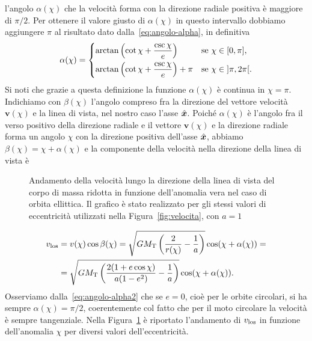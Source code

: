 {l'angolo $\alpha(\chi)$ che la velocità forma con la direzione radiale positiva
è maggiore di $\pi/2$. Per ottenere il valore giusto di $\alpha(\chi)$ in questo
intervallo dobbiamo aggiungere $\pi$ al risultato dato
dalla~\eqref{eq:angolo-alpha}, in definitiva
\begin{equation}
  \label{eq:angolo-alpha2}
  \alpha(\chi) =
  \begin{dcases}
    \arctan
    \left(
      \cot\chi + \frac{\csc\chi}{e}
    \right) & \text{se $\chi \in \mathopen{[}0, \pi\mathclose{]}$,}\\
    \arctan
    \left(
      \cot\chi + \frac{\csc\chi}{e}
    \right) + \pi & \text{se $\chi \in \mathopen{]}\pi, 2\pi\mathclose{[}$.}
  \end{dcases}
\end{equation}
Si noti che grazie a questa definizione la funzione $\alpha(\chi)$ è continua
in $\chi = \pi$. Indichiamo con $\beta(\chi)$ l'angolo compreso fra la
direzione del vettore velocità $\bm{v}(\chi)$ e la linea di vista, nel nostro
caso l'asse $\hat{\bm{x}}$. Poiché $\alpha(\chi)$ è l'angolo fra il verso
positivo della direzione radiale e il vettore $\bm{v}(\chi)$ e la direzione
radiale forma un angolo $\chi$ con la direzione positiva dell'asse
$\hat{\bm{x}}$, abbiamo $\beta(\chi) = \chi + \alpha(\chi)$ e la componente
della velocità nella direzione della linea di vista è
\begin{figure}
  \centering
  
  \caption[Andamento della velocità nella direzione della di vista in funzione
  dell'anomalia
  vera]{Andamento della velocità lungo la direzione della linea di vista del
    corpo di massa ridotta in funzione dell'anomalia vera nel caso di orbita
    ellittica. Il grafico è stato realizzato per gli stessi valori di
    eccentricità utilizzati nella Figura~\ref{fig:velocita}, con $a=1$}
  \label{fig:velocita-los}
\end{figure}
\begin{equation}
  \begin{split}
    v_\textup{los} &= v(\chi)\cos\beta(\chi) = \sqrt{GM_\textup{T} \left(
      \frac{2}{r(\chi)} - \frac{1}{a}
    \right)}\cos(\chi + \alpha(\chi)) = \\
    &= \sqrt{GM_\textup{T}
    \left(
      \frac{2(1+e\cos\chi)}{a(1-e^2)} - \frac{1}{a}
    \right)}\cos(\chi + \alpha(\chi)).
  \end{split}
\end{equation}
Osserviamo dalla~\eqref{eq:angolo-alpha2} che se $e=0$, cioè per le orbite
circolari, si ha sempre $\alpha(\chi) = \pi/2$, coerentemente col fatto che
per il moto circolare la velocità è sempre tangenziale. Nella
Figura~\ref{fig:velocita-los} è riportato l'andamento di $v_\textup{los}$ in
funzione dell'anomalia $\chi$ per diversi valori dell'eccentricità.

}
